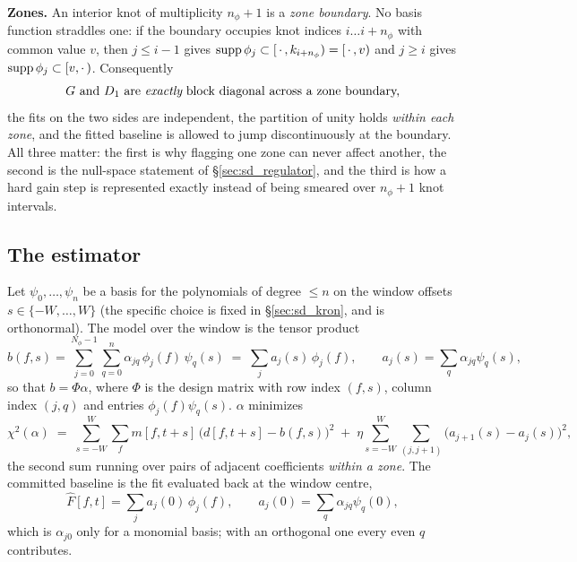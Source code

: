 \documentclass{article}
\numberwithin{equation}{section}   %
\begin{document}
{\bf Zones.}  An interior knot of multiplicity $n_\phi+1$ is a {\em zone boundary}.  No basis function
straddles one: if the boundary occupies knot indices $i \ldots i+n_\phi$ with common value $v$, then $j \le
i-1$ gives ${\rm supp}\,\phi_j \subset [\,\cdot\,, k_{i+n_\phi}) = [\,\cdot\,, v)$ and $j \ge i$ gives
${\rm supp}\,\phi_j \subset [v, \cdot\,)$.  Consequently
\begin{equation}
\mbox{$G$ and $D_1$ are {\em exactly} block diagonal across a zone boundary,}
\label{eq:sd_zone}
\end{equation}
the fits on the two sides are independent, the partition of unity holds {\em within each zone}, and the fitted
baseline is allowed to jump discontinuously at the boundary.  All three matter: the first is why flagging one
zone can never affect another, the second is the null-space statement of \S\ref{sec:sd_regulator}, and the
third is how a hard gain step is represented exactly instead of being smeared over $n_\phi+1$ knot intervals.

\subsection{The estimator}
\label{sec:sd_estimator}

Let $\psi_0, \ldots, \psi_n$ be a basis for the polynomials of degree $\le n$ on the window offsets
$s \in \{-W, \ldots, W\}$ (the specific choice is fixed in \S\ref{sec:sd_kron}, and is orthonormal).  The
model over the window is the tensor product
\begin{equation}
b(f,s) = \sum_{j=0}^{N_\phi-1} \sum_{q=0}^{n} \alpha_{jq}\, \phi_j(f)\, \psi_q(s)
       \;=\; \sum_j a_j(s)\, \phi_j(f),
\qquad a_j(s) = \sum_q \alpha_{jq} \psi_q(s),
\label{eq:sd_model}
\end{equation}
so that $b = \Phi\alpha$, where $\Phi$ is the design matrix with row index $(f,s)$, column index $(j,q)$ and
entries $\phi_j(f)\psi_q(s)$.  $\alpha$ minimizes
\begin{equation}
\chi^2(\alpha) \;=\;
\sum_{s=-W}^{W} \sum_f m[f,t+s]\,\Big(d[f,t+s] - b(f,s)\Big)^2
\;+\; \eta \sum_{s=-W}^{W} \sum_{(j,j+1)} \Big(a_{j+1}(s) - a_j(s)\Big)^2 ,
\label{eq:sd_chi2}
\end{equation}
the second sum running over pairs of adjacent coefficients {\em within a zone}.  The committed baseline is the
fit evaluated back at the window centre,
\begin{equation}
\hat F[f,t] = \sum_j a_j(0)\,\phi_j(f), \qquad a_j(0) = \sum_q \alpha_{jq}\psi_q(0) ,
\label{eq:sd_commit}
\end{equation}
which is $\alpha_{j0}$ only for a monomial basis; with an orthogonal one every even $q$ contributes.
\end{document}
